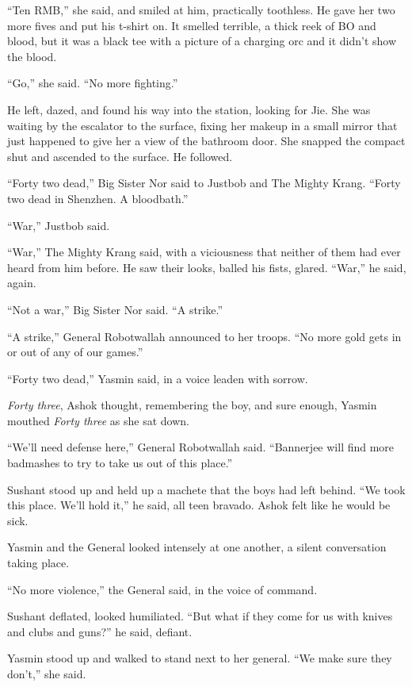 ``Ten RMB,'' she said, and smiled at him, practically toothless. He
gave her two more fives and put his t-shirt on. It smelled
terrible, a thick reek of BO and blood, but it was a black tee with
a picture of a charging orc and it didn't show the blood.

``Go,'' she said. ``No more fighting.''

He left, dazed, and found his way into the station, looking for
Jie. She was waiting by the escalator to the surface, fixing her
makeup in a small mirror that just happened to give her a view of
the bathroom door. She snapped the compact shut and ascended to the
surface. He followed.

\tb

``Forty two dead,'' Big Sister Nor said to Justbob and The Mighty
Krang. ``Forty two dead in Shenzhen. A bloodbath.''

``War,'' Justbob said.

``War,'' The Mighty Krang said, with a viciousness that neither of
them had ever heard from him before. He saw their looks, balled his
fists, glared. ``War,'' he said, again.

``Not a war,'' Big Sister Nor said. ``A strike.''

\tb

``A strike,'' General Robotwallah announced to her troops. ``No more
gold gets in or out of any of our games.''

``Forty two dead,'' Yasmin said, in a voice leaden with sorrow.

\emph{Forty three}, Ashok thought, remembering the boy, and sure
enough, Yasmin mouthed \emph{Forty three} as she sat down.

``We'll need defense here,'' General Robotwallah said. ``Bannerjee
will find more badmashes to try to take us out of this place.''

Sushant stood up and held up a machete that the boys had left
behind. ``We took this place. We'll hold it,'' he said, all teen
bravado. Ashok felt like he would be sick.

Yasmin and the General looked intensely at one another, a silent
conversation taking place.

``No more violence,'' the General said, in the voice of command.

Sushant deflated, looked humiliated. ``But what if they come for us
with knives and clubs and guns?'' he said, defiant.

Yasmin stood up and walked to stand next to her general. ``We make
sure they don't,'' she said.

